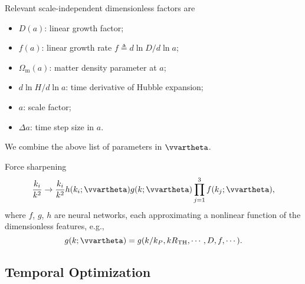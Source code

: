\documentclass[usenatbib]{mnras}
\renewcommand{\d}{d}
\newcommand{\Omegam}{\Omega_\mathrm{m}}
\newcommand{\tophat}{\mathrm{TH}}
\begin{document}
Relevant scale-independent dimensionless factors are
\begin{itemize}
\item $D(a)$: linear growth factor;
\item $f(a)$: linear growth rate $f \triangleq \d\ln D / \d\ln a$;
\item $\Omegam(a)$: matter density parameter at $a$;
\item $\d\ln H / \d\ln a$: time derivative of Hubble expansion;
\item $a$: scale factor;
\item $\Delta a$: time step size in $a$.
\end{itemize}

We combine the above list of parameters in $\vvartheta$.


Force sharpening
%
\begin{equation}
\frac{k_i}{k^2} \to \frac{k_i}{k^2}
  h(k_i; \vvartheta) g(k; \vvartheta) \prod_{j=1}^3 f(k_j; \vvartheta),
\end{equation}
%
where $f$, $g$, $h$ are neural networks, each approximating a nonlinear
function of the dimensionless features, e.g.,
%
\begin{equation}
g(k; \vvartheta) = g(k/k_P, kR_\tophat, \cdots, D, f, \cdots).
\end{equation}


\subsection{Temporal Optimization}
\end{document}
